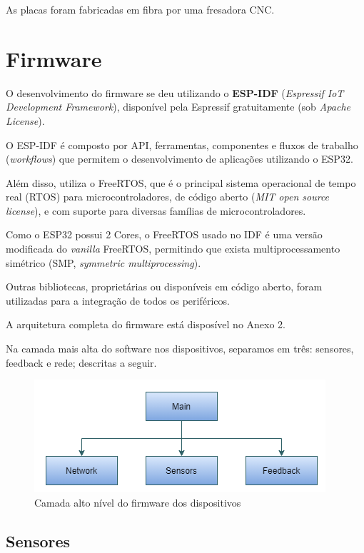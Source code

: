\documentclass[../monografia.tex]{subfiles}
\begin{document}
As placas foram fabricadas em fibra por uma fresadora CNC.

\section{Firmware}

O desenvolvimento do firmware se deu utilizando o \textbf{ESP-IDF} (\textit{Espressif IoT Development Framework}), disponível pela Espressif\cite{esp-idf} gratuitamente (sob \textit{Apache License}). 

O ESP-IDF é composto por API, ferramentas, componentes e fluxos de trabalho (\textit{workflows}) que permitem o desenvolvimento de aplicações utilizando o ESP32. 

Além disso, utiliza o FreeRTOS, que é o principal sistema operacional de tempo real (RTOS) para microcontroladores\cite{freertos}, de código aberto (\textit{MIT open source license}), e com suporte para diversas famílias de microcontroladores.

Como o ESP32 possui 2 Cores, o FreeRTOS usado no IDF é uma versão modificada do \textit{vanilla} FreeRTOS, permitindo que exista multiprocessamento simétrico (SMP, \textit{symmetric multiprocessing}).

Outras bibliotecas, proprietárias ou disponíveis em código aberto, foram utilizadas para a integração de todos os periféricos. 

A arquitetura completa do firmware está disposível no Anexo 2.

Na camada mais alta do software nos dispositivos, separamos em três: sensores, feedback e rede; descritas a seguir. %

\begin{figure}[h!]
	\centering
	\includegraphics[]{fw-arch-1}
	\caption{Camada alto nível do firmware dos dispositivos}
	\label{fig:fw-arch}
\end{figure}

\subsection{Sensores}
\end{document}
